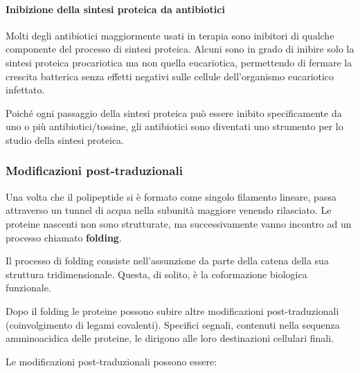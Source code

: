 \documentclass[]{article}
\begin{document}
\paragraph{Inibizione della sintesi proteica da
antibiotici}\label{inibizione-della-sintesi-proteica-da-antibiotici}

Molti degli antibiotici maggiormente usati in terapia sono inibitori di
qualche componente del processo di sintesi proteica. Alcuni sono in
grado di inibire solo la sintesi proteica procariotica ma non quella
eucariotica, permettendo di fermare la crescita batterica senza effetti
negativi sulle cellule dell'organismo eucariotico infettato.

Poiché ogni passaggio della sintesi proteica può essere inibito
specificamente da uno o più antibiotici/tossine, gli antibiotici sono
diventati uno strumento per lo studio della sintesi proteica.

\subsubsection{Modificazioni
post-traduzionali}\label{modificazioni-post-traduzionali}

Una volta che il polipeptide si è formato come singolo filamento
lineare, passa attraverso un tunnel di acqua nella subunità maggiore
venendo rilasciato. Le proteine nascenti non sono strutturate, ma
successivamente vanno incontro ad un processo chiamato \textbf{folding}.

Il processo di folding consiste nell'assunzione da parte della catena
della sua struttura tridimensionale. Questa, di solito, è la
coformazione biologica funzionale.

Dopo il folding le proteine possono subire altre modificazioni
post-traduzionali (coinvolgimento di legami covalenti). Specifici
segnali, contenuti nella sequenza amminoacidica delle proteine, le
dirigono alle loro destinazioni cellulari finali.

Le modificazioni post-traduzionali possono essere:
\end{document}
